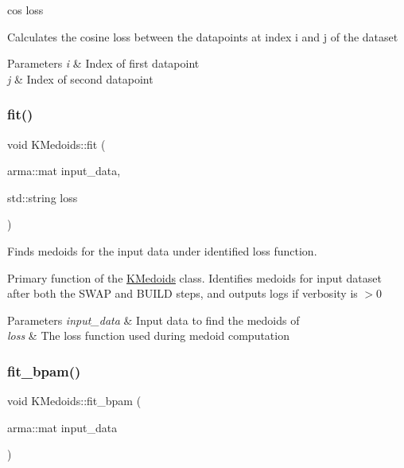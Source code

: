 cos loss 

Calculates the cosine loss between the datapoints at index i and j of the dataset


\begin{DoxyParams}{Parameters}
{\em i} & Index of first datapoint \\
\hline
{\em j} & Index of second datapoint \\
\hline
\end{DoxyParams}
\mbox{\label{classKMedoids_ae241800e72a6b4a677333ffbf06e1798}} 
\subsubsection{\texorpdfstring{fit()}{fit()}}
{\footnotesize\ttfamily void K\+Medoids\+::fit (\begin{DoxyParamCaption}\item[{arma\+::mat}]{input\+\_\+data,  }\item[{std\+::string}]{loss }\end{DoxyParamCaption})}



Finds medoids for the input data under identified loss function. 

Primary function of the \hyperlink{classKMedoids}{K\+Medoids} class. Identifies medoids for input dataset after both the S\+W\+AP and B\+U\+I\+LD steps, and outputs logs if verbosity is $>$0


\begin{DoxyParams}{Parameters}
{\em input\+\_\+data} & Input data to find the medoids of \\
\hline
{\em loss} & The loss function used during medoid computation \\
\hline
\end{DoxyParams}
\mbox{\label{classKMedoids_afb08301b64e5be0b9f274a14908c7869}} 
\subsubsection{\texorpdfstring{fit\+\_\+bpam()}{fit\_bpam()}}
{\footnotesize\ttfamily void K\+Medoids\+::fit\+\_\+bpam (\begin{DoxyParamCaption}\item[{arma\+::mat}]{input\+\_\+data }\end{DoxyParamCaption})\hspace{0.3cm}{\ttfamily [private]}}



